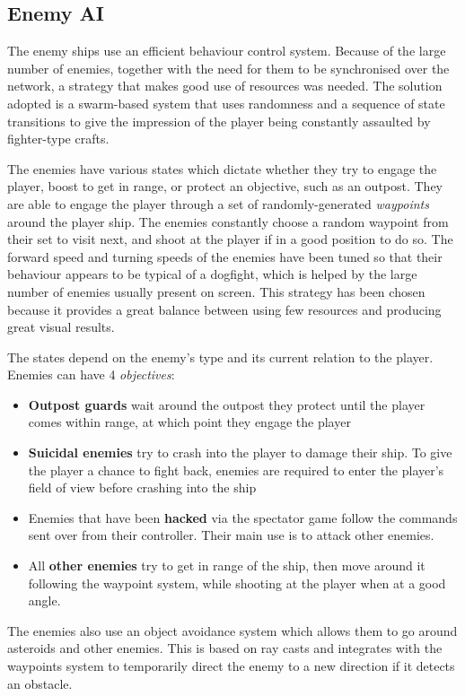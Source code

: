 \documentclass[a4paper,11pt]{article}
\begin{document}
\subsection{Enemy AI}
The enemy ships use an efficient behaviour control system. Because of the large number of enemies, together with the need for them to be synchronised over the network, a strategy that makes good use of resources was needed. The solution adopted is a swarm-based system that uses randomness and a sequence of state transitions to give the impression of the player being constantly assaulted by fighter-type crafts. 

The enemies have various states which dictate whether they try to engage the player, boost to get in range, or protect an objective, such as an outpost. They are able to engage the player through a set of randomly-generated \emph{waypoints} around the player ship. The enemies constantly choose a random waypoint from their set to visit next, and shoot at the player if in a good position to do so. The forward speed and turning speeds of the enemies have been tuned so that their behaviour appears to be typical of a dogfight, which is helped by the large number of enemies usually present on screen. This strategy has been chosen because it provides a great balance between using few resources and producing great visual results.

The states depend on the enemy’s type and its current relation to the player. Enemies can have 4 \emph{objectives}:

\begin{itemize}[noitemsep,topsep=.5ex]
	\item \textbf{Outpost guards} wait around the outpost they protect until the player comes within range, at which point they engage the player
	\item \textbf{Suicidal enemies} try to crash into the player to damage their ship. To give the player a chance to fight back, enemies are required to enter the player’s field of view before crashing into the ship
	\item Enemies that have been \textbf{hacked} via the spectator game follow the commands sent over from their controller. Their main use is to attack other enemies.
	\item All \textbf{other enemies} try to get in range of the ship, then move around it following the waypoint system, while shooting at the player when at a good angle.
\end{itemize}

The enemies also use an object avoidance system which allows them to go around asteroids and other enemies. This is based on ray casts and integrates with the waypoints system to temporarily direct the enemy to a new direction if it detects an obstacle.
\end{document}
